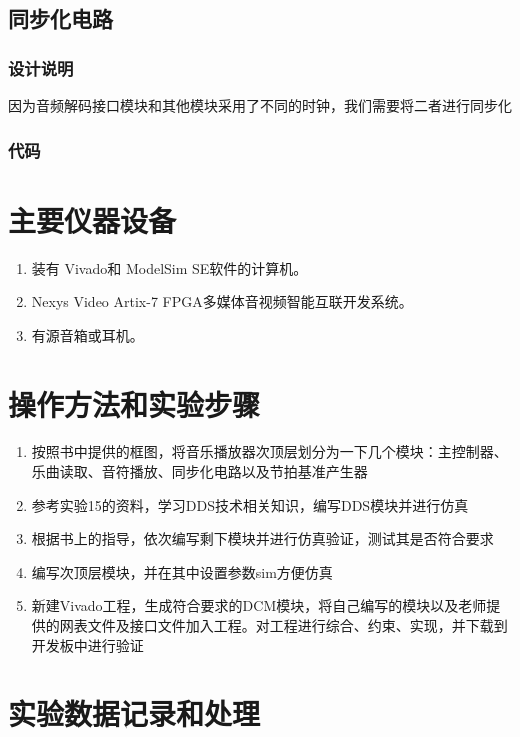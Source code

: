 \documentclass{../source/zjureport}
\begin{document}
    \subsection{同步化电路}
        \subsubsection{设计说明}
        因为音频解码接口模块和其他模块采用了不同的时钟，我们需要将二者进行同步化
        \subsubsection{代码}
        

\section{主要仪器设备}
\begin{enumerate}
    \item 装有 Vivado和 ModelSim SE软件的计算机。
    \item Nexys Video Artix-7 FPGA多媒体音视频智能互联开发系统。
    \item 有源音箱或耳机。
\end{enumerate}

\section{操作方法和实验步骤}
\begin{enumerate}
    \item 按照书中提供的框图，将音乐播放器次顶层划分为一下几个模块：主控制器、乐曲读取、音符播放、同步化电路以及节拍基准产生器
    \item 参考实验15的资料，学习DDS技术相关知识，编写DDS模块并进行仿真
    \item 根据书上的指导，依次编写剩下模块并进行仿真验证，测试其是否符合要求
    \item 编写次顶层模块，并在其中设置参数sim方便仿真
    \item 新建Vivado工程，生成符合要求的DCM模块，将自己编写的模块以及老师提供的网表文件及接口文件加入工程。对工程进行综合、约束、实现，并下载到开发板中进行验证
\end{enumerate}

\section{实验数据记录和处理}
\end{document}
